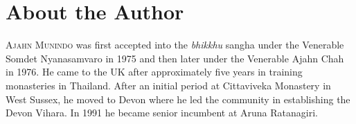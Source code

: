 \chapter{About the Author}

\textsc{Ajahn Munindo} was first accepted into the \emph{bhikkhu} sangha under the
Venerable Somdet Nyanasamvaro in 1975 and then later under the Venerable Ajahn
Chah in 1976. He came to the UK after approximately five years in training
monasteries in Thailand. After an initial period at Cittaviveka Monastery in
West Sussex, he moved to Devon where he led the community in establishing the
Devon Vihara. In 1991 he became senior incumbent at Aruna Ratanagiri.

